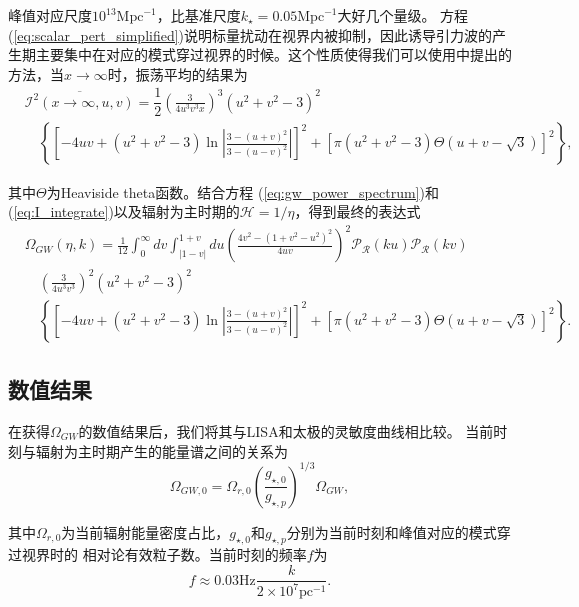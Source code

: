 峰值对应尺度$10^{13}\text{Mpc}^{-1}$，比基准尺度$k_{\star}=0.05\text{Mpc}^{-1}$大好几个量级。
方程
(\ref{eq:scalar_pert_simplified})说明标量扰动在视界内被抑制，因此诱导引力波的产生期主要集中在对应的模式穿过视界的时候。这个性质使得我们可以使用\citep{kohri2018semianalytic}中提出的方法，当$x\rightarrow
\infty$时，振荡平均的结果为
\begin{equation}
\begin{split}
    & \overline{\mathcal{I}^{2}(x\rightarrow\infty,u,v)} =
    \dfrac{1}{2}{\left(\frac{3}{4u^3v^3x}\right)}^3 {\left(u^2+v^2-3\right)}^2 \\
    &\quad \left\{ {\left[ -4uv+(u^2+v^2-3)\ln\left|\frac{3-{(u+v)}^2}{3-{(u-v)}^2}\right| \right]}^2 +
    {\left[ \pi(u^2+v^2-3)\Theta(u+v-\sqrt{3}) \right]}^2
    \right\},
\end{split}
\end{equation}

其中$\Theta$为Heaviside theta函数。结合方程
(\ref{eq:gw_power_spectrum})和
(\ref{eq:I_integrate})以及辐射为主时期的$\mathcal{H}=1/\eta$，得到最终的表达式
\begin{equation}\label{eq:omega_final}
\begin{split}
    & \Omega_{GW}(\eta,k) = \frac{1}{12}\int_0^\infty dv \int_{|1-v|}^{1+v} du
    {\left(\frac{4v^2-{(1+v^2-u^2)}^2}{4uv}\right)}^2
    \mathcal{P_R}(ku)\mathcal{P_R}(kv) \\
    & \quad {\left(\frac{3}{4u^3v^3}\right)}^2
    {\left(u^2+v^2-3\right)}^2 \\
    &\quad \left\{ {\left[ -4uv+(u^2+v^2-3)\ln\left|\frac{3-{(u+v)}^2}{3-{(u-v)}^2}\right| \right]}^2 +
    {\left[ \pi(u^2+v^2-3)\Theta(u+v-\sqrt{3}) \right]}^2
    \right\}.
\end{split}
\end{equation}

\subsection{数值结果}
在获得$\Omega_{GW}$的数值结果后，我们将其与LISA\citep{amaro2017laser}和太极\citep{guo2018taiji}的灵敏度曲线相比较。
当前时刻与辐射为主时期产生的能量谱之间的关系为
\begin{equation}
    \Omega_{GW,0}=\Omega_{r,0}{\left(\frac{g_{\star,0}}{g_{\star,p}}\right)}^{1/3}\Omega_{GW}, 
\end{equation}

其中$\Omega_{r,0}$为当前辐射能量密度占比，$g_{\star,0}$和$g_{\star,p}$分别为当前时刻和峰值对应的模式穿过视界时的
相对论有效粒子数。当前时刻的频率$f$为
\begin{equation}
    f \approx 0.03\text{Hz}\frac{k}{2\times10^7\text{pc}^{-1}}.
\end{equation}

